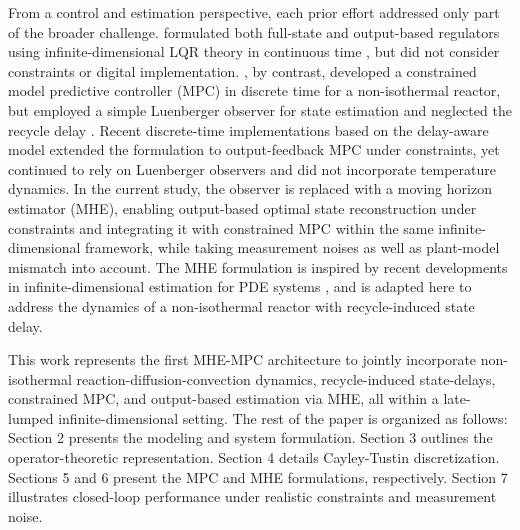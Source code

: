 From a control and estimation perspective, each prior effort addressed only part of the broader challenge.  formulated both full-state and output-based regulators using infinite-dimensional LQR theory in continuous time \autocite{Moadeli2025Optimal}, but did not consider constraints or digital implementation. , by contrast, developed a constrained model predictive controller (MPC) in discrete time for a non-isothermal reactor, but employed a simple Luenberger observer for state estimation and neglected the recycle delay \autocite{Khatibi2021Model}. Recent discrete-time implementations based on the delay-aware model \autocite{Moadeli2025Model,Moadeli2025Observer} extended the formulation to output-feedback MPC under constraints, yet continued to rely on Luenberger observers and did not incorporate temperature dynamics. In the current study, the observer is replaced with a moving horizon estimator (MHE), enabling output-based optimal state reconstruction under constraints and integrating it with constrained MPC within the same infinite-dimensional framework, while taking measurement noises as well as plant-model mismatch into account. The MHE formulation is inspired by recent developments in infinite-dimensional estimation for PDE systems \autocite{xie2022constrained, zhang2023tracking}, and is adapted here to address the dynamics of a non-isothermal reactor with recycle-induced state delay.

This work represents the first MHE-MPC architecture to jointly incorporate non-isothermal reaction-diffusion-convection dynamics, recycle-induced state-delays, constrained MPC, and output-based estimation via MHE, all within a late-lumped infinite-dimensional setting. The rest of the paper is organized as follows: Section 2 presents the modeling and system formulation. Section 3 outlines the operator-theoretic representation. Section 4 details Cayley-Tustin discretization. Sections 5 and 6 present the MPC and MHE formulations, respectively. Section 7 illustrates closed-loop performance under realistic constraints and measurement noise.
